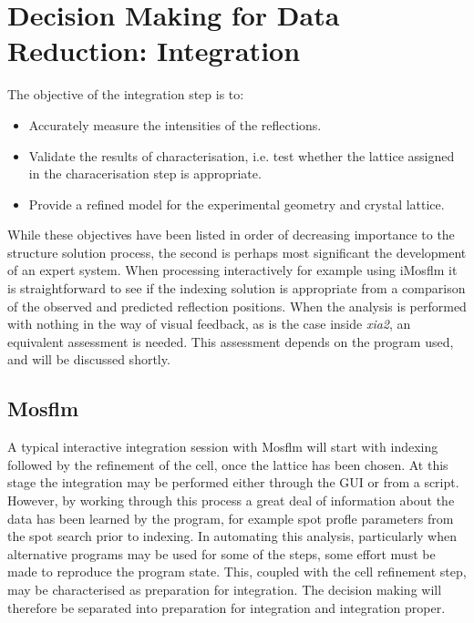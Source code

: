 \documentclass[preprint,pdf]{iucr}
\begin{document}

\section{Decision Making for Data Reduction: Integration}

The objective of the integration step is to:

\begin{itemize}
\item{Accurately measure the intensities of the reflections.}
\item{Validate the results of characterisation, i.e. test whether the
    lattice assigned in the characerisation step is appropriate.}
\item{Provide a refined model for the experimental geometry and
    crystal lattice.}
\end{itemize}

\noindent
While these objectives have been listed in order of decreasing
importance to the structure solution process, the second is perhaps
most significant the development of an expert system. When processing
interactively for example using iMosflm it is
straightforward to see if the indexing solution is appropriate from a
comparison of the observed and predicted reflection positions. When
the analysis is performed with nothing in the way of visual feedback,
as is the case inside \emph{xia2}, an equivalent assessment is
needed. This assessment depends on the program used, and will be
discussed shortly.

\subsection{Mosflm}

A typical interactive integration session with Mosflm will start with
indexing followed by the refinement of the cell, once the lattice has
been chosen. At this stage the integration may be performed either
through the GUI or from a script. However, by working through this
process a great deal of information about the data has been learned by
the program, for example spot profle parameters from the spot search
prior to indexing. In automating this analysis, particularly when
alternative programs may be used for some of the steps, some effort
must be made to reproduce the program state. This, coupled with the
cell refinement step, may be characterised as preparation for
integration. The decision making will therefore be separated into
preparation for integration and integration proper.
\end{document}
